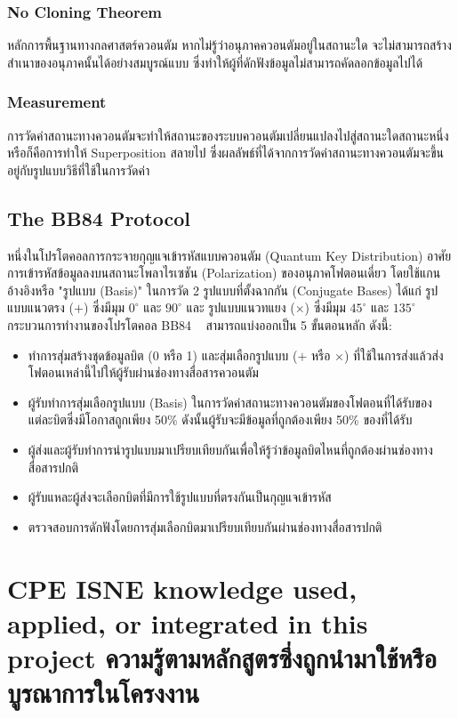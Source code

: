 \subsubsection{No Cloning Theorem}
หลักการพื้นฐานทางกลศาสตร์ควอนตัม หากไม่รู้ว่าอนุภาคควอนตัมอยู่ในสถานะใด จะไม่สามารถสร้างสำเนาของอนุภาคนั้นได้อย่างสมบูรณ์แบบ
ซึ่งทำให้ผู้ที่ดักฟังข้อมูลไม่สามารถคัดลอกข้อมูลไปได้
\subsubsection{Measurement}
การวัดค่าสถานะทางควอนตัมจะทำให้สถานะของระบบควอนตัมเปลี่ยนแปลงไปสู่สถานะใดสถานะหนึ่ง หรือก็คือการทำให้ Superposition สลายไป
ซึ่งผลลัพธ์ที่ได้จากการวัดค่าสถานะทางควอนตัมจะขึ้นอยู่กับรูปแบบวิธีที่ใช้ในการวัดค่า

\subsection{The BB84 Protocol}
หนึ่งในโปรโตคอลการกระจายกุญแจเข้ารหัสแบบควอนตัม (Quantum Key Distribution)
อาศัยการเข้ารหัสข้อมูลลงบนสถานะโพลาไรเซชัน (Polarization) ของอนุภาคโฟตอนเดี่ยว โดยใช้แกนอ้างอิงหรือ "รูปแบบ (Basis)" ในการวัด 2 รูปแบบที่ตั้งฉากกัน (Conjugate Bases) ได้แก่ รูปแบบแนวตรง ($+$) ซึ่งมีมุม $0^\circ$ และ $90^\circ$ และ รูปแบบแนวทแยง ($\times$) ซึ่งมีมุม $45^\circ$ และ $135^\circ$
กระบวนการทำงานของโปรโตคอล BB84 ~\cite{bb84} สามารถแบ่งออกเป็น 5 ขั้นตอนหลัก ดังนี้:
\begin{itemize}
    \item ทำการสุ่มสร้างชุดข้อมูลบิต (0 หรือ 1) และสุ่มเลือกรูปแบบ ($+$ หรือ $\times$) ที่ใช้ในการส่งแล้วส่งโฟตอนเหล่านี้ไปให้ผู้รับผ่านช่องทางสื่อสารควอนตัม
    \item ผู้รับทำการสุ่มเลือกรูปแบบ (Basis) ในการวัดค่าสถานะทางควอนตัมของโฟตอนที่ได้รับของแต่ละบิตซึ่งมีโอกาสถูกเพียง 50\% ดังนั้นผู้รับจะมีข้อมูลที่ถูกต้องเพียง 50\% ของที่ได้รับ
    \item ผู้ส่งและผู้รับทำการนำรูปแบบมาเปรียบเทียบกันเพื่อให้รู้ว่าข้อมูลบิตไหนที่ถูกต้องผ่านช่องทางสื่อสารปกติ
    \item ผู้รับแหละผู้ส่งจะเลือกบิตที่มีการใช้รูปแบบที่ตรงกันเป็นกุญแจเข้ารหัส
    \item ตรวจสอบการดักฟังโดยการสุ่มเลือกบิตมาเปรียบเทียบกันผ่านช่องทางสื่อสารปกติ
\end{itemize}

\section{\ifenglish%
\ifcpe CPE \else ISNE \fi knowledge used, applied, or integrated in this project
\else%
ความรู้ตามหลักสูตรซึ่งถูกนำมาใช้หรือบูรณาการในโครงงาน
\fi
}
